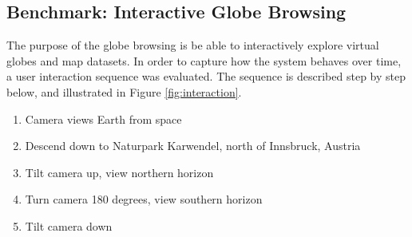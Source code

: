 \clearpage
\subsection{Benchmark: Interactive Globe Browsing}
\FloatBarrier
The purpose of the globe browsing is be able to interactively explore virtual globes and map datasets. In order to capture how the system behaves over time, a user interaction sequence was evaluated. The sequence is described step by step below, and illustrated in Figure \ref{fig:interaction}.

\begin{enumerate}
  \item Camera views Earth from space
  \item Descend down to Naturpark Karwendel, north of Innsbruck, Austria
  \item Tilt camera up, view northern horizon
  \item Turn camera 180 degrees, view southern horizon
  \item Tilt camera down
\end{enumerate}

